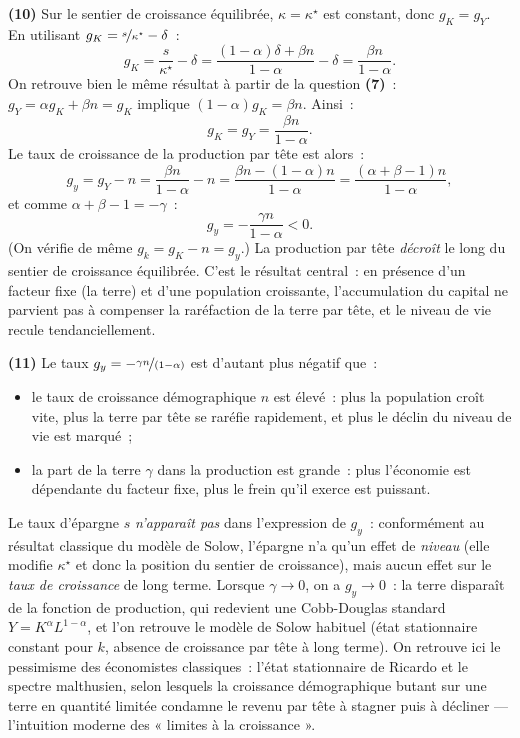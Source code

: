 \documentclass[11pt,a4paper,notitlepage]{article}
\begin{document}
\textbf{(10)} Sur le sentier de croissance équilibrée,
$\kappa=\kappa^{\star}$ est constant, donc $g_K=g_Y$. En utilisant
$g_K=\nicefrac{s}{\kappa^{\star}}-\delta$~:
\[
g_K = \frac{s}{\kappa^{\star}}-\delta
    = \frac{(1-\alpha)\delta+\beta n}{1-\alpha}-\delta
    = \frac{\beta n}{1-\alpha}.
\]
On retrouve bien le même résultat à partir de la question \textbf{(7)}~:
$g_Y=\alpha g_K+\beta n=g_K$ implique $(1-\alpha)g_K=\beta n$. Ainsi~:
\[
g_K = g_Y = \frac{\beta n}{1-\alpha}.
\]
Le taux de croissance de la production par tête est alors~:
\[
g_y = g_Y - n = \frac{\beta n}{1-\alpha} - n
    = \frac{\beta n-(1-\alpha)n}{1-\alpha}
    = \frac{(\alpha+\beta-1)n}{1-\alpha},
\]
et comme $\alpha+\beta-1=-\gamma$~:
\[
\boxed{\;g_y = -\frac{\gamma n}{1-\alpha} < 0.\;}
\]
(On vérifie de même $g_k=g_K-n=g_y$.) La production par tête
\emph{décroît} le long du sentier de croissance équilibrée. C'est le
résultat central~: en présence d'un facteur fixe (la terre) et d'une
population croissante, l'accumulation du capital ne parvient pas à
compenser la raréfaction de la terre par tête, et le niveau de vie
recule tendanciellement.

\textbf{(11)} Le taux $g_y=-\nicefrac{\gamma n}{(1-\alpha)}$ est
d'autant plus négatif que~:
\begin{itemize}
\item le taux de croissance démographique $n$ est élevé~: plus la
  population croît vite, plus la terre par tête se raréfie rapidement,
  et plus le déclin du niveau de vie est marqué~;
\item la part de la terre $\gamma$ dans la production est grande~:
  plus l'économie est dépendante du facteur fixe, plus le frein
  qu'il exerce est puissant.
\end{itemize}
Le taux d'épargne $s$ \emph{n'apparaît pas} dans l'expression de
$g_y$~: conformément au résultat classique du modèle de Solow,
l'épargne n'a qu'un effet de \emph{niveau} (elle modifie
$\kappa^{\star}$ et donc la position du sentier de croissance), mais
aucun effet sur le \emph{taux de croissance} de long terme. Lorsque
$\gamma\rightarrow 0$, on a $g_y\rightarrow 0$~: la terre disparaît de
la fonction de production, qui redevient une Cobb-Douglas standard
$Y=K^{\alpha}L^{1-\alpha}$, et l'on retrouve le modèle de Solow
habituel (état stationnaire constant pour $k$, absence de croissance
par tête à long terme). On retrouve ici le pessimisme des économistes
classiques~: l'état stationnaire de Ricardo et le spectre malthusien,
selon lesquels la croissance démographique butant sur une terre en
quantité limitée condamne le revenu par tête à stagner puis à décliner
— l'intuition moderne des « limites à la croissance ».
\end{document}
